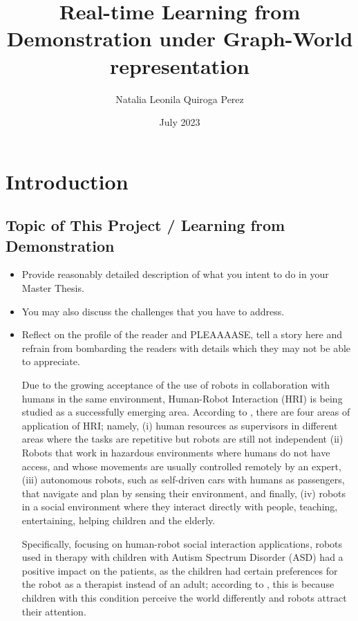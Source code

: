 \documentclass[thesis]{mas_proposal}
\title{Real-time Learning from Demonstration under Graph-World representation}
\author{Natalia Leonila Quiroga Perez}
\date{July 2023}
\begin{document}
\maketitle

\pagestyle{plain}

\section{Introduction}

\subsection{Topic of This  Project / Learning from Demonstration }
\begin{itemize}
    \item Provide reasonably detailed description of what you intent to do in your Master Thesis.
    \item You may also discuss the challenges that you have to address.
    \item Reflect on the profile of the reader and PLEAAAASE, tell a story here and refrain from bombarding the readers with details which they may not be able to appreciate.

    Due to the growing acceptance of the use of robots in collaboration with humans in the same environment, Human-Robot Interaction (HRI) is being studied as a successfully emerging area. According to \cite{sheridan2016}, there are four areas of application of HRI; namely, (i) human resources as supervisors in different areas where the tasks are repetitive but robots are still not independent (ii) Robots that work in hazardous environments where humans do not have access, and whose movements are usually controlled remotely by an expert, (iii) autonomous robots, such as self-driven cars with humans as passengers, that navigate and plan by sensing their environment, and finally, (iv) robots in a social environment where they interact directly with people, teaching, entertaining, helping children and the elderly.
    
    Specifically, focusing on human-robot social interaction applications, robots used in therapy with children with Autism Spectrum Disorder (ASD) had a positive impact on the patients, as the children had certain preferences for the robot as a therapist instead of an adult; according to \cite{prabha2019}, this is because children with this condition perceive the world differently and robots attract their attention.
    

\end{itemize}
\end{document}
